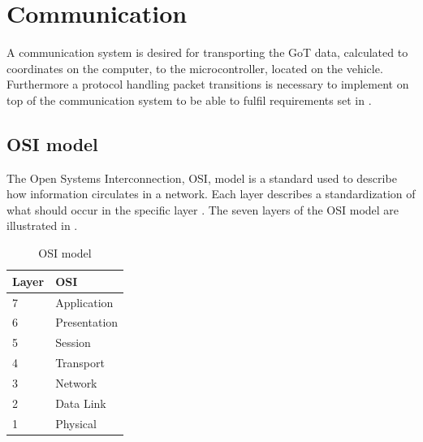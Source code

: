 \chapter{Communication}
A communication system is desired for transporting the GoT data, calculated to coordinates on the computer, to the microcontroller, located on the vehicle. Furthermore a protocol handling packet transitions is necessary to implement on top of the communication system to be able to fulfil requirements set in .

\section{OSI model}
The Open Systems Interconnection, OSI, model is a standard used to describe how information circulates in a network. Each layer describes a standardization of what should occur in the specific layer \cite{Microsoft}. The seven layers of the OSI model are illustrated in .

\begin{table}[H]\centering
\begin{tabular}{|p{1.5cm}|p{3cm}|}
\hline%
  \textbf{Layer} & \textbf{OSI} \\
\hline%
    7 &    Application      \\
\hline%
    6 &    Presentation      \\
\hline%
    5 &    Session       \\
\hline%
    4 &    Transport    \\
\hline%
    3 &   Network     \\
\hline%
    2 &   Data Link     \\
\hline%
    1 &    Physical     \\
\hline%
\end{tabular}
\caption{OSI model}
\label{tab:OSIModel}
\end{table}


